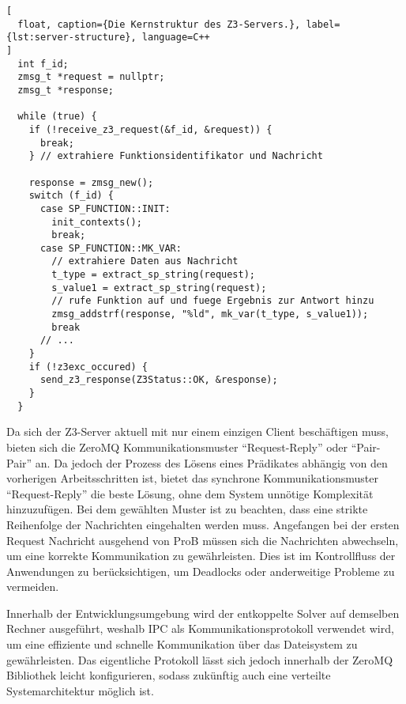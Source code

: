 \begin{lstlisting}[
  float, caption={Die Kernstruktur des Z3-Servers.}, label={lst:server-structure}, language=C++
]
  int f_id;
  zmsg_t *request = nullptr;
  zmsg_t *response;

  while (true) {
    if (!receive_z3_request(&f_id, &request)) {
      break;
    } // extrahiere Funktionsidentifikator und Nachricht

    response = zmsg_new();
    switch (f_id) {
      case SP_FUNCTION::INIT:
        init_contexts();
        break;
      case SP_FUNCTION::MK_VAR:
        // extrahiere Daten aus Nachricht
        t_type = extract_sp_string(request);
        s_value1 = extract_sp_string(request);
        // rufe Funktion auf und fuege Ergebnis zur Antwort hinzu
        zmsg_addstrf(response, "%ld", mk_var(t_type, s_value1));
        break
      // ...
    }
    if (!z3exc_occured) {
      send_z3_response(Z3Status::OK, &response);
    }
  }
\end{lstlisting}


Da sich der Z3-Server aktuell mit nur einem einzigen Client beschäftigen muss,
bieten sich die ZeroMQ Kommunikationsmuster \enquote{Request-Reply} oder \enquote{Pair-Pair} an.
Da jedoch der Prozess des Lösens eines Prädikates abhängig von den vorherigen Arbeitsschritten ist,
bietet das synchrone Kommunikationsmuster \enquote{Request-Reply} die beste Lösung, ohne dem System unnötige Komplexität hinzuzufügen.
Bei dem gewählten Muster ist zu beachten, dass eine strikte Reihenfolge der Nachrichten eingehalten werden muss.
Angefangen bei der ersten Request Nachricht ausgehend von ProB müssen sich die Nachrichten abwechseln, um eine korrekte Kommunikation zu gewährleisten.
Dies ist im Kontrollfluss der Anwendungen zu berücksichtigen, um Deadlocks oder anderweitige Probleme zu vermeiden.

Innerhalb der Entwicklungsumgebung wird der entkoppelte Solver auf demselben Rechner ausgeführt,
weshalb IPC als Kommunikationsprotokoll verwendet wird, um eine effiziente und schnelle Kommunikation über das Dateisystem zu gewährleisten.
Das eigentliche Protokoll lässt sich jedoch innerhalb der ZeroMQ Bibliothek leicht konfigurieren, sodass zukünftig auch eine verteilte Systemarchitektur möglich ist.

